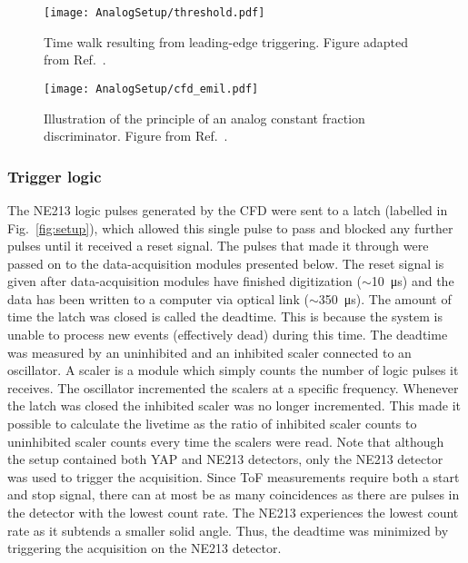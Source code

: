 \documentclass[main.tex]{subfiles}
\begin{document}
\begin{figure}[h]
    \centering
        \texttt{[image: AnalogSetup/threshold.pdf]}
        \caption[Time walk resulting from leading edge triggering]{Time walk resulting from leading-edge triggering. Figure adapted from Ref.~\cite{rofors}.}
    \label{fig:discriminator}
\end{figure}

\begin{figure}[h]
    \centering
        \texttt{[image: AnalogSetup/cfd\_emil.pdf]}
        \caption[CFD trigger principle]{Illustration of the principle of an analog constant fraction discriminator. Figure from Ref.~\cite{rofors}.}
    \label{fig:cfd}
\end{figure}



\subsubsection{Trigger logic}
The NE213 logic pulses generated by the CFD were sent to a latch (labelled  in Fig.~\ref{fig:setup}), which allowed this single pulse to pass and blocked any further pulses until it received a reset signal. The pulses that made it through were passed on to the data-acquisition modules presented below. The reset signal is given after data-acquisition modules have finished digitization ($\sim$\SI{10}{\micro s}) and the data has been written to a computer via optical link ($\sim$\SI{350}{\micro s}). The amount of time the latch was closed is called the deadtime. This is because the system is unable to process new events (effectively dead) during this time. The deadtime was measured by an uninhibited and an inhibited scaler connected to an oscillator. A scaler is a module which simply counts the number of logic pulses it receives. The oscillator incremented the scalers at a specific frequency. Whenever the latch was closed the inhibited scaler was no longer incremented. This made it possible to calculate the livetime as the ratio of inhibited scaler counts to uninhibited scaler counts every time the scalers were read. Note that although the setup contained both YAP and NE213 detectors, only the NE213 detector was used to trigger the acquisition. Since ToF measurements require both a start and stop signal, there can at most be as many coincidences as there are pulses in the detector with the lowest count rate. The NE213 experiences the lowest count rate as it subtends a smaller solid angle. Thus, the deadtime was minimized by triggering the acquisition on the NE213 detector.
\end{document}
